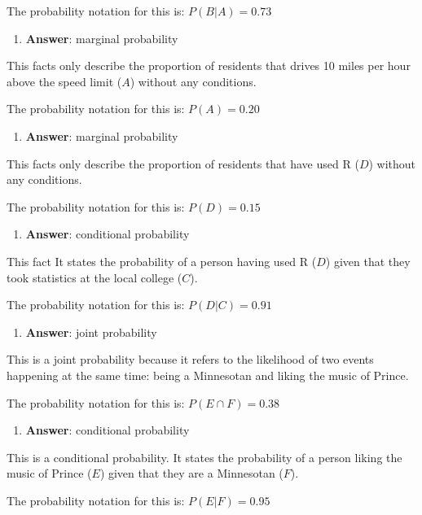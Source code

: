 \documentclass[
  letterpaper,
  DIV=11,
  numbers=noendperiod]{scrartcl}
\providecommand{\tightlist}{%
  \setlength{\itemsep}{0pt}\setlength{\parskip}{0pt}}
\theoremstyle{definition}
\theoremstyle{remark}
\begin{document}
The probability notation for this is: \(P(B|A) = 0.73\)

\begin{enumerate}
\def\labelenumi{\alph{enumi})}
\setcounter{enumi}{1}
\tightlist
\item
  \textbf{Answer}: marginal probability
\end{enumerate}

This facts only describe the proportion of residents that drives 10
miles per hour above the speed limit (\(A\)) without any conditions.

The probability notation for this is: \(P(A) = 0.20\)

\begin{enumerate}
\def\labelenumi{\alph{enumi})}
\setcounter{enumi}{2}
\tightlist
\item
  \textbf{Answer}: marginal probability
\end{enumerate}

This facts only describe the proportion of residents that have used R
(\(D\)) without any conditions.

The probability notation for this is: \(P(D) = 0.15\)

\begin{enumerate}
\def\labelenumi{\alph{enumi})}
\setcounter{enumi}{3}
\tightlist
\item
  \textbf{Answer}: conditional probability
\end{enumerate}

This fact It states the probability of a person having used R (\(D\))
given that they took statistics at the local college (\(C\)).

The probability notation for this is: \(P(D|C) = 0.91\)

\begin{enumerate}
\def\labelenumi{\alph{enumi})}
\setcounter{enumi}{4}
\tightlist
\item
  \textbf{Answer}: joint probability
\end{enumerate}

This is a joint probability because it refers to the likelihood of two
events happening at the same time: being a Minnesotan and liking the
music of Prince.

The probability notation for this is: \(P(E \cap F) = 0.38\)

\begin{enumerate}
\def\labelenumi{\alph{enumi})}
\setcounter{enumi}{5}
\tightlist
\item
  \textbf{Answer}: conditional probability
\end{enumerate}

This is a conditional probability. It states the probability of a person
liking the music of Prince (\(E\)) given that they are a Minnesotan
(\(F\)).

The probability notation for this is: \(P(E|F) = 0.95\)
\end{document}
